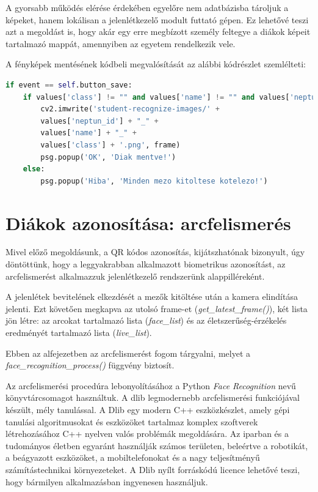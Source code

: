 A gyorsabb működés elérése érdekében egyelőre nem adatbázisba tároljuk a képeket, hanem lokálisan a jelenlétkezelő modult futtató gépen. Ez lehetővé teszi azt a megoldást is, hogy akár egy erre megbízott személy feltegye a diákok képeit tartalmazó mappát, amennyiben az egyetem rendelkezik vele.

\newpage

A fényképek mentésének kódbeli megvalósítását az alábbi kódrészlet szemlélteti:

\begin{lstlisting}[language=python]
if event == self.button_save:
    if values['class'] != "" and values['name'] != "" and values['neptun_id'] != "":
        cv2.imwrite('student-recognize-images/' + 
        values['neptun_id'] + "_" + 
        values['name'] + "_" + 
        values['class'] + '.png', frame)
        psg.popup('OK', 'Diak mentve!')
    else:
        psg.popup('Hiba', 'Minden mezo kitoltese kotelezo!')
\end{lstlisting}


\section{Diákok azonosítása: arcfelismerés}

Mivel előző megoldásunk, a QR kódos azonosítás, kijátszhatónak bizonyult, úgy döntöttünk, hogy a leggyakrabban alkalmazott biometrikus azonosítást, az arcfelismerést alkalmazzuk jelenlétkezelő rendszerünk alappilléreként.


A jelenlétek bevitelének elkezdését a mezők kitöltése után a kamera elindítása jelenti. Ezt követően megkapva az utolsó frame-et (\textit{get\_latest\_frame()}), két lista jön létre: az arcokat tartalmazó lista (\textit{face\_list}) és az életszerűség-érzékelés eredményét tartalmazó lista (\textit{live\_list}).

Ebben az alfejezetben az arcfelismerést fogom tárgyalni, melyet a \textit{face\_recognition\_process()} függvény biztosít. 

Az arcfelismerési procedúra lebonyolításához a Python \textit{Face Recognition} nevű könyvtárcsomagot használtuk. A dlib legmodernebb arcfelismerési funkciójával készült, mély tanulással.
A Dlib egy modern C++ eszközkészlet, amely gépi tanulási algoritmusokat és eszközöket tartalmaz komplex szoftverek létrehozásához C++ nyelven valós problémák megoldására. Az iparban és a tudományos életben egyaránt használják számos területen, beleértve a robotikát, a beágyazott eszközöket, a mobiltelefonokat és a nagy teljesítményű számítástechnikai környezeteket. A Dlib nyílt forráskódú licence lehetővé teszi, hogy bármilyen alkalmazásban ingyenesen használjuk.


